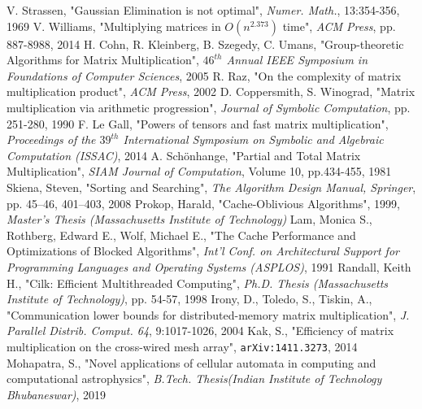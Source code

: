 \documentclass{article}
\begin{document}
\begin{thebibliography}{99}

V. Strassen, "Gaussian Elimination is not optimal", \textit{Numer. Math.}, 13:354-356, 1969
V. Williams, "Multiplying matrices in $O(n^{2.373})$ time", \textit{ACM Press}, pp. 887-8988, 2014
H. Cohn, R. Kleinberg, B. Szegedy, C. Umans, "Group-theoretic Algorithms for Matrix Multiplication", \textit{$46^{th}$ Annual IEEE Symposium in Foundations of Computer Sciences}, 2005
R. Raz, "On the complexity of matrix multiplication product", \textit{ACM Press}, 2002
D. Coppersmith, S. Winograd, "Matrix multiplication via arithmetic progression", \textit{Journal of Symbolic Computation}, pp. 251-280, 1990
F. Le Gall, "Powers of tensors and fast matrix multiplication", \textit{Proceedings of the $39^{th}$ International Symposium on Symbolic and Algebraic Computation (ISSAC)}, 2014
A. Sch\"onhange, "Partial and Total Matrix Multiplication", \textit{SIAM Journal of Computation}, Volume 10, pp.434-455, 1981
Skiena, Steven, "Sorting and Searching", \textit{The Algorithm Design Manual, Springer}, pp. 45–46, 401–403, 2008
Prokop, Harald, "Cache-Oblivious Algorithms", 1999, \textit{Master's Thesis (Massachusetts Institute of Technology)}
Lam, Monica S., Rothberg, Edward E., Wolf, Michael E., "The Cache Performance and Optimizations of Blocked Algorithms", \textit{Int'l Conf. on Architectural Support for Programming Languages and Operating Systems (ASPLOS)}, 1991
Randall, Keith H., "Cilk: Efficient Multithreaded Computing", \textit{Ph.D. Thesis (Massachusetts Institute of Technology)}, pp. 54-57, 1998
Irony, D., Toledo, S., Tiskin, A., "Communication lower bounds for distributed-memory matrix multiplication", \textit{J. Parallel Distrib. Comput. 64}, 9:1017-1026, 2004
Kak, S., "Efficiency of matrix multiplication on the cross-wired mesh array", \texttt{arXiv:1411.3273}, 2014
Mohapatra, S., "Novel applications of cellular automata in computing and computational astrophysics", \textit{B.Tech. Thesis(Indian Institute of Technology Bhubaneswar)}, 2019

\end{thebibliography}
\end{document}
